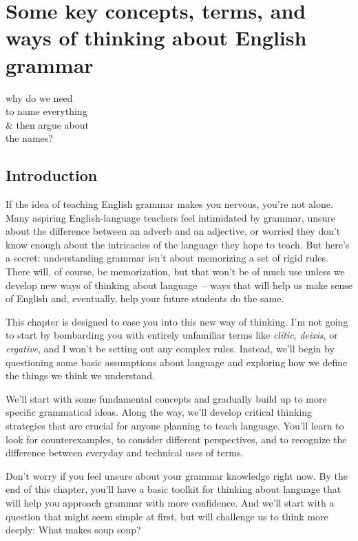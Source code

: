 \chapter{Some key concepts, terms, and ways of thinking about English grammar}\label{ch:1}


\epigraph{why do we need\\
to name everything\\
\& then argue about\\
the names?}{}


\section{Introduction}\label{sec:intro1}

If the idea of teaching English grammar makes you nervous, you're not alone. Many aspiring English-language teachers feel intimidated by grammar, unsure about the difference between an adverb and an adjective, or worried they don't know enough about the intricacies of the language they hope to teach. But here's a secret: understanding grammar isn't about memorizing a set of rigid rules. There will, of course, be memorization, but that won't be of much use unless we develop new ways of thinking about language~-- ways that will help us make sense of English and, eventually, help your future students do the same.

This chapter is designed to ease you into this new way of thinking. I'm not going to start by bombarding you with entirely unfamiliar terms like \textit{clitic}, \textit{deixis}, or \textit{ergative}, and I won't be setting out any complex rules. Instead, we'll begin by questioning some basic assumptions about language and exploring how we define the things we think we understand.

We'll start with some fundamental concepts and gradually build up to more specific grammatical ideas. Along the way, we'll develop critical thinking strategies that are crucial for anyone planning to teach language. You'll learn to look for counterexamples, to consider different perspectives, and to recognize the difference between everyday and technical uses of terms.

Don't worry if you feel unsure about your grammar knowledge right now. By the end of this chapter, you'll have a basic toolkit for thinking about language that will help you approach grammar with more confidence. And we'll start with a question that might seem simple at first, but will challenge us to think more deeply: What makes soup soup?

